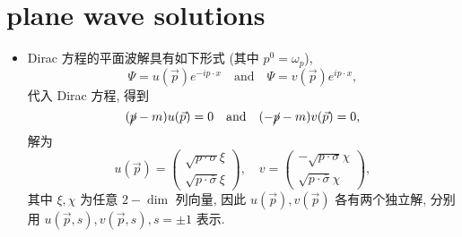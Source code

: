 \section{plane wave solutions}
\begin{itemize}
	\item Dirac 方程的平面波解具有如下形式 (其中 $p^0 = \omega_p$),
	\begin{equation}
		\Psi = u(\vec{p}) e^{- i p \cdot x} \quad \text{and} \quad \Psi = v(\vec{p}) e^{i p \cdot x},
	\end{equation}
	代入 Dirac 方程, 得到
	\begin{equation}
		(\cancel{p} - m) u(\vec{p}) = 0 \quad \text{and} \quad (- \cancel{p} - m) v(\vec{p}) = 0,
	\end{equation}
	解为
	\begin{equation}
		u(\vec{p}) = \begin{pmatrix}
			\sqrt{p \cdot \sigma} \xi \\
			\sqrt{p \cdot \bar{\sigma}} \xi
		\end{pmatrix}, \quad v = \begin{pmatrix}
			- \sqrt{p \cdot \sigma} \chi \\
			\sqrt{p \cdot \bar{\sigma}} \chi
		\end{pmatrix},
	\end{equation}
	其中 $\xi, \chi$ 为任意 $2-\dim$ 列向量, 因此 $u(\vec{p}), v(\vec{p})$ 各有两个独立解, 分别用 $u(\vec{p}, s), v(\vec{p}, s), s = \pm 1$ 表示.
	

\end{itemize}
